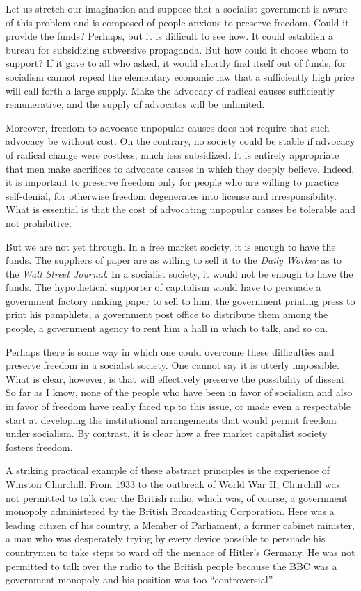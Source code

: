 \documentclass[11pt,openany]{book}
\begin{document}
Let us stretch our imagination and suppose that a socialist government is aware of this problem and is composed of people anxious to preserve freedom. Could it provide the funds? Perhaps, but it is difficult to see how. It could establish a bureau for subsidizing subversive propaganda. But how could it choose whom to support? If it gave to all who asked, it would shortly find itself out of funds, for socialism cannot repeal the elementary economic law that a sufficiently high price will call forth a large supply. Make the advocacy of radical causes sufficiently remunerative, and the supply of advocates will be unlimited.

Moreover, freedom to advocate unpopular causes does not require that such advocacy be without cost. On the contrary, no society could be stable if advocacy of radical change were costless, much less subsidized. It is entirely appropriate that men make sacrifices to advocate causes in which they deeply believe. Indeed, it is important to preserve freedom only for people who are willing to practice self-denial, for otherwise freedom degenerates into license and irresponsibility. What is essential is that the cost of advocating unpopular causes be tolerable and not prohibitive.

But we are not yet through. In a free market society, it is enough to have the funds. The suppliers of paper are as willing to sell it to the \emph{Daily Worker} as to the \emph{Wall Street Journal}. In a socialist society, it would not be enough to have the funds. The hypothetical supporter of capitalism would have to persuade a government factory making paper to sell to him, the government printing press to print his pamphlets, a government post office to distribute them among the people, a government agency to rent him a hall in which to talk, and so on.

Perhaps there is some way in which one could overcome these difficulties and preserve freedom in a socialist society. One cannot say it is utterly impossible. What is clear, however, is that will effectively preserve the possibility of dissent. So far as I know, none of the people who have been in favor of socialism and also in favor of freedom have really faced up to this issue, or made even a respectable start at developing the institutional arrangements that would permit freedom under socialism. By contrast, it is clear how a free market capitalist society fosters freedom.

A striking practical example of these abstract principles is the experience of Winston Churchill. From 1933 to the outbreak of World War II, Churchill was not permitted to talk over the British radio, which was, of course, a government monopoly administered by the British Broadcasting Corporation. Here was a leading citizen of his country, a Member of Parliament, a former cabinet minister, a man who was desperately trying by every device possible to persuade his countrymen to take steps to ward off the menace of Hitler's Germany. He was not permitted to talk over the radio to the British people because the BBC was a government monopoly and his position was too ``controversial''.
\end{document}

